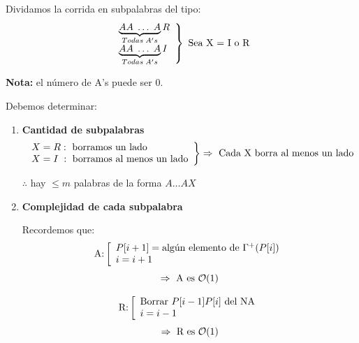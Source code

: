 \documentclass[12pt,a4paper]{report}
\begin{document}
  			\par Dividamos la corrida en subpalabras del tipo:
  			\begin{equation*}
  		  	\left.
  		  	\begin{array}{l}
  		    	\underbrace{AA \; \dotsc \; A}_{Todas \; A's}R \\
  		    	\underbrace{AA \; \dotsc \; A}_{Todas \; A's}I
  		  	\end{array}
  		  	\right\rbrace
  		  	\textup{ Sea X = I o R}
  			\end{equation*}
  			\par \textbf{Nota:} el número de A's puede ser 0.
  			\vspace{1.5mm}
  			\par Debemos determinar:
  			\begin{enumerate}
  				\item \textbf{Cantidad de subpalabras}
  					\begin{equation*}
  						\left.
  						\begin{array}{l}
  							X = R: \textup{ borramos un lado} \\
  							X = I \; : \textup{ borramos al menos un lado}
  						\end{array}
  						\right\rbrace
  						\Rightarrow \textup{ Cada X borra al menos un lado}
  					\end{equation*}
  					\begin{center}
  						$\therefore$ hay $\leq m$ palabras de la forma $A \dotsc A X$
  					\end{center}
  				\item \textbf{Complejidad de cada subpalabra}
  					\par Recordemos que:
  					\begin{equation*}
  						\textup{A:}
  						\left[
  						\begin{array}{l}
  							P[i + 1] = \textup{algún elemento de } \Gamma^{+}(P[i]) \\
  							i = i + 1
  						\end{array}
  						\right.
  					\end{equation*}
  					\[ \Rightarrow \textup{ A es } \mathcal{O}(1) \]

  					\begin{equation*}
  						\textup{R:}
  						\left[
  						\begin{array}{l}
  							\textup{Borrar } P[i - 1]P[i] \textup{ del NA} \\
  							i = i - 1
  						\end{array}
  						\right.
  					\end{equation*}
  					\[ \Rightarrow \textup{ R es } \mathcal{O}(1) \]


\end{enumerate}
\end{document}
